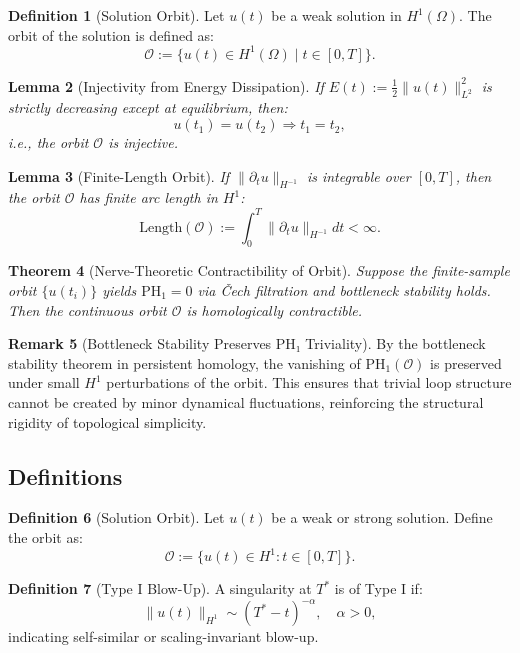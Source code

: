 \documentclass[11pt]{article}
\newtheorem{theorem}{Theorem}[section]
\newtheorem{lemma}[theorem]{Lemma}
\theoremstyle{definition}
\newtheorem{definition}[theorem]{Definition}
\newtheorem{remark}[theorem]{Remark}
\begin{document}
\begin{definition}[Solution Orbit]
Let $u(t)$ be a weak solution in $H^1(\Omega)$. The orbit of the solution is defined as:
\[
\mathcal{O} := \{ u(t) \in H^1(\Omega) \mid t \in [0,T] \}.
\]
\end{definition}

\begin{lemma}[Injectivity from Energy Dissipation]
If $E(t) := \frac{1}{2} \| u(t) \|_{L^2}^2$ is strictly decreasing except at equilibrium, then:
\[
u(t_1) = u(t_2) \Rightarrow t_1 = t_2,
\]
i.e., the orbit $\mathcal{O}$ is injective.
\end{lemma}

\begin{lemma}[Finite-Length Orbit]
If $\| \partial_t u \|_{H^{-1}}$ is integrable over $[0,T]$, then the orbit $\mathcal{O}$ has finite arc length in $H^1$:
\[
\mathrm{Length}(\mathcal{O}) := \int_0^T \| \partial_t u \|_{H^{-1}} dt < \infty.
\]
\end{lemma}

\begin{theorem}[Nerve-Theoretic Contractibility of Orbit]
Suppose the finite-sample orbit $\{u(t_i)\}$ yields $\mathrm{PH}_1 = 0$ via Čech filtration and bottleneck stability holds. Then the continuous orbit $\mathcal{O}$ is homologically contractible.
\end{theorem}

\begin{remark}[Bottleneck Stability Preserves PH₁ Triviality]
By the bottleneck stability theorem in persistent homology, the vanishing of $\mathrm{PH}_1(\mathcal{O})$ is preserved under small $H^1$ perturbations of the orbit. This ensures that trivial loop structure cannot be created by minor dynamical fluctuations, reinforcing the structural rigidity of topological simplicity.
\end{remark}

\subsection{Definitions}

\begin{definition}[Solution Orbit]
Let $u(t)$ be a weak or strong solution. Define the orbit as:
\[
\mathcal{O} := \{u(t) \in H^1 : t \in [0,T]\}.
\]
\end{definition}

\begin{definition}[Type I Blow-Up]
A singularity at $T^*$ is of Type I if:
\[
\|u(t)\|_{H^1} \sim (T^* - t)^{-\alpha}, \quad \alpha > 0,
\]
indicating self-similar or scaling-invariant blow-up.
\end{definition}
\end{document}
